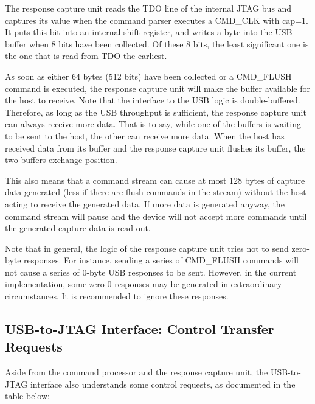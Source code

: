 \documentclass[main\_\_EN.tex]{subfiles}
\begin{document}
The response capture unit reads the TDO line of the internal JTAG bus and captures its value when the command parser executes a CMD\_CLK with cap=1. It puts this bit into an internal shift register, and writes a byte into the USB buffer when 8 bits have been collected. Of these 8 bits, the least significant one is the one that is read from TDO the earliest.

As soon as either 64 bytes (512 bits) have been collected or a CMD\_FLUSH command is executed, the response capture unit will make the buffer available for the host to receive. Note that the interface to the USB logic is double-buffered. Therefore, as long as the USB throughput is sufficient, the response capture unit can always receive more data. That is to say, while one of the buffers is waiting to be sent to the host, the other can receive more data. When the host has received data from its buffer and the response capture unit flushes its buffer, the two buffers exchange position.

This also means that a command stream can cause at most 128 bytes of capture data generated (less if there are flush commands in the stream) without the host acting to receive the generated data. If more data is generated anyway, the command stream will pause and the device will not accept more commands until the generated capture data is read out.

Note that in general, the logic of the response capture unit tries not to send zero-byte responses. For instance, sending a series of CMD\_FLUSH commands will not cause a series of 0-byte USB responses to be sent. However, in the current implementation, some zero-0 responses may be generated in extraordinary circumstances. It is recommended to ignore these responses.

\subsection{USB-to-JTAG Interface: Control Transfer Requests}

Aside from the command processor and the response capture unit, the USB-to-JTAG interface also understands some control requests, as documented in the table below:
\end{document}
